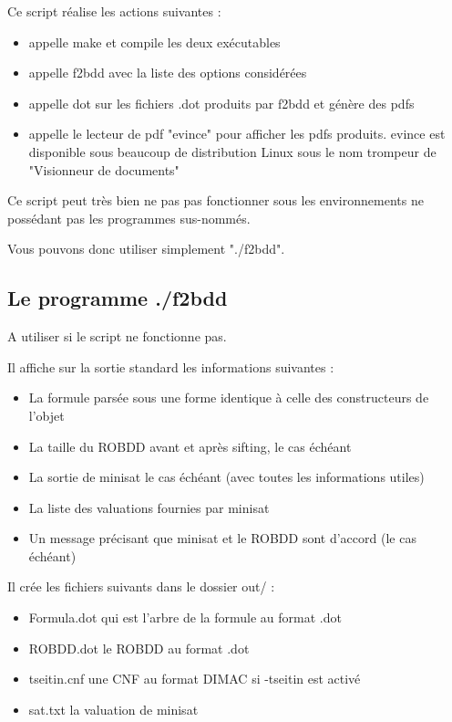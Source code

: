 \documentclass[a4paper,10pt]{article}
\begin{document}
Ce script réalise les actions suivantes :

\begin{itemize}
\item appelle make et compile les deux exécutables
\item appelle f2bdd avec la liste des options considérées
\item appelle dot sur les fichiers .dot produits par f2bdd et génère des pdfs
\item appelle le lecteur de pdf "evince" pour afficher les pdfs produits. evince est disponible sous beaucoup de distribution Linux sous le nom trompeur de "Visionneur de documents"
\end{itemize}

Ce script peut très bien ne pas pas fonctionner sous les environnements ne possédant pas les programmes sus-nommés.

Vous pouvons donc utiliser simplement "./f2bdd".

\subsection{Le programme ./f2bdd}

A utiliser si le script ne fonctionne pas.

Il affiche sur la sortie standard les informations suivantes :

\begin{itemize}
\item La formule parsée sous une forme identique à celle des constructeurs de l'objet
\item La taille du ROBDD avant et après sifting, le cas échéant
\item La sortie de minisat le cas échéant (avec toutes les informations utiles)
\item La liste des valuations fournies par minisat
\item Un message précisant que minisat et le ROBDD sont d'accord (le cas échéant)
\end{itemize}

Il crée les fichiers suivants dans le dossier out/ :

\begin{itemize}
\item Formula.dot qui est l'arbre de la formule au format .dot
\item ROBDD.dot le ROBDD au format .dot
\item tseitin.cnf une CNF au format DIMAC si -tseitin est activé
\item sat.txt la valuation de minisat
\end{itemize}
\end{document}
